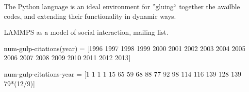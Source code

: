The Python language is an ideal environment for ''gluing`` together 
the availble codes, and extending their functionality in dynamic ways. 

LAMMPS as a model of social interaction, mailing list. 


num-gulp-citations(year) = [1996 1997 1998 1999 2000 2001 2002 2003 2004 2005 2006 2007 2008 2009 2010 2011 2012 2013] 

num-gulp-citations-year = [1 1 1 1 15 65 59 68 88 77 92 98 114 116 139 128 139 79*(12/9)] 

